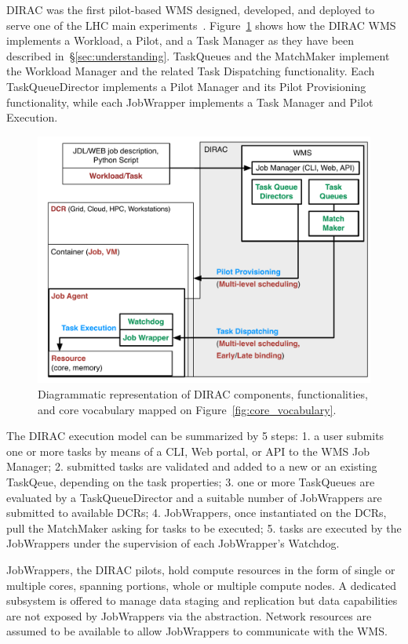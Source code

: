 \documentclass{sig-alternate}
\begin{document}
DIRAC was the first pilot-based WMS designed, developed, and deployed to serve
one of the LHC main experiments~\cite{}. Figure~\ref{fig:dirac_comparison} shows
how the DIRAC WMS implements a Workload, a Pilot, and a Task Manager as they
have been described in~\S\ref{sec:understanding}. TaskQueues and the MatchMaker
implement the Workload Manager and the related Task Dispatching functionality.
Each TaskQueueDirector implements a Pilot Manager and its Pilot Provisioning
functionality, while each JobWrapper implements a Task Manager and Pilot
Execution.

\begin{figure}[t]
    \centering
        \includegraphics[width=.48\textwidth]{figures/dirac_comparison.pdf}
    \caption{Diagrammatic representation of DIRAC components, functionalities,
    and core vocabulary mapped on Figure~\ref{fig:core_vocabulary}.}
    \label{fig:dirac_comparison}
\end{figure}

The DIRAC execution model can be summarized by 5 steps: 1. a user submits one or
more tasks by means of a CLI, Web portal, or API to the WMS Job Manager; 2.
submitted tasks are validated and added to a new or an existing TaskQeue,
depending on the task properties; 3. one or more TaskQueues are evaluated by a
TaskQueueDirector and a suitable number of JobWrappers are submitted to
available DCRs; 4. JobWrappers, once instantiated on the DCRs, pull the
MatchMaker asking for tasks to be executed; 5. tasks are executed by the
JobWrappers under the supervision of each JobWrapper's Watchdog.


JobWrappers, the DIRAC pilots, hold compute resources in the form of single or
multiple cores, spanning portions, whole or multiple compute nodes. A dedicated
subsystem is offered to manage data staging and replication but data
capabilities are not exposed by JobWrappers via the \pilot abstraction. Network
resources are assumed to be available to allow JobWrappers to communicate with
the WMS.
\end{document}
